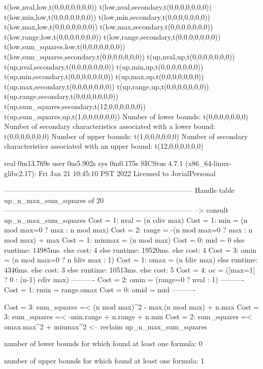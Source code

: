 t(low,nval,low,t(0,0,0,0,0,0,0))
t(low,nval,secondary,t(0,0,0,0,0,0,0))
t(low,min,low,t(0,0,0,0,0,0,0))
t(low,min,secondary,t(0,0,0,0,0,0,0))
t(low,max,low,t(0,0,0,0,0,0,0))
t(low,max,secondary,t(0,0,0,0,0,0,0))
t(low,range,low,t(0,0,0,0,0,0,0))
t(low,range,secondary,t(0,0,0,0,0,0,0))
t(low,sum_squares,low,t(0,0,0,0,0,0,0))
t(low,sum_squares,secondary,t(0,0,0,0,0,0,0))
t(up,nval,up,t(0,0,0,0,0,0,0))
t(up,nval,secondary,t(0,0,0,0,0,0,0))
t(up,min,up,t(0,0,0,0,0,0,0))
t(up,min,secondary,t(0,0,0,0,0,0,0))
t(up,max,up,t(0,0,0,0,0,0,0))
t(up,max,secondary,t(0,0,0,0,0,0,0))
t(up,range,up,t(0,0,0,0,0,0,0))
t(up,range,secondary,t(0,0,0,0,0,0,0))
t(up,sum_squares,secondary,t(12,0,0,0,0,0,0))
t(up,sum_squares,up,t(1,0,0,0,0,0,0))
Number of lower bounds:                                             t(0,0,0,0,0,0,0)
Number of secondary characteristics associated with a lower bound:  t(0,0,0,0,0,0,0)
Number of upper bounds:                                             t(1,0,0,0,0,0,0)
Number of secondary characteristics associated with an upper bound: t(12,0,0,0,0,0,0)

real	0m13.769s
user	0m5.902s
sys	0m0.175s
SICStus 4.7.1 (x86_64-linux-glibc2.17): Fri Jan 21 10:45:10 PST 2022
Licensed to JovialPersonal


--------------------------------------------------------------------------------
Handle table up_n_max_sum_squares of 20
--------------------------------------------------------------------------------
--> consult up_n_max_sum_squares
Cost =  1:  nval   = (n cdiv max)
Cost =  1:  min    = (n mod max=0 ? max : n mod max)
Cost =  2:  range  = -(n mod max=0 ? max : n mod max) + max
Cost =  1:  minmax = (n mod max)
Cost =  0:  mid    = 0
else runtime: 14985ms. else cost: 4
else runtime: 19520ms. else cost: 4
Cost =  3:  omin   = (n mod max=0 ? n fdiv max : 1) %
Cost =  1:  omax   = (n fdiv max)
else runtime: 4346ms. else cost: 3
else runtime: 10513ms. else cost: 5
Cost =  4:  oc     = ([max=1] ? 0 : (n-1) cdiv max) %
----------
Cost =  2:  omin   = (range=0 ? nval : 1)
----------
Cost =  1:  rmin   = range.omax
Cost =  0:  omid   = mid
----------

Cost =  3:  sum_squares =< (n mod max)^2 - max.(n mod max) + n.max
Cost =  3:  sum_squares =< -min.range + n.range + n.min
Cost =  2:  sum_squares =< omax.max^2 + minmax^2
<-- reclaim up_n_max_sum_squares

number of lower bounds for which found at least one formula: 0

number of upper bounds for which found at least one formula: 1

